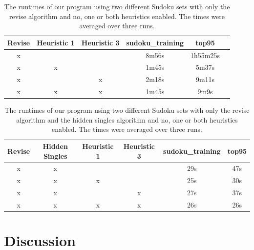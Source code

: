 \documentclass[11pt]{article} %
\begin{document}
\begin{table}[htbp]
\begin{center}
\begin{tabular}{c c c c c c}
\hline
 Revise & Heuristic 1 & Heuristic 3 & sudoku\_training & top95 \\
\hline
x &  &  & 8m56s & 1h55m25s \\ %
x & x &  & 1m45s & 5m37s \\ %
x &  & x & 2m18s & 9m11s \\ %
x & x & x & 1m45s & 9m9s \\ %
\hline
\end{tabular}
\end{center}
\caption{The runtimes of our program using two different Sudoku sets with only the revise algorithm and no, one or both heuristics enabled.  The times were averaged over three runs.}
\label{tab:heur_results}
\end{table}

\begin{table}[htbp]
\begin{center}
\begin{tabular}{c c c c c c}
\hline
 Revise & Hidden Singles & Heuristic 1 & Heuristic 3 & sudoku\_training & top95 \\
\hline
x & x &  &  & 29s & 47s \\ %
x & x & x &  & 25s & 30s \\ %
x & x &  & x & 27s & 37s \\ %
x & x & x & x & 26s & 26s \\ %
\hline
\end{tabular}
\end{center}
\caption{The runtimes of our program using two different Sudoku sets with only the revise algorithm and the hidden singles algorithm and no, one or both heuristics enabled. The times were averaged over three runs.}
\label{tab:hs+heur_results}
\end{table}

\section{Discussion}
\end{document}
